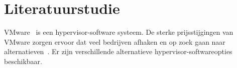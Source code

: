 






\section{Literatuurstudie}
\label{sec:literatuurstudie}
VMware~\autocite{vmware} is een hypervisor-software systeem. De sterke prijsstijgingen van VMware zorgen ervoor dat veel bedrijven afhaken en op zoek gaan naar alternatieven~\autocite{Hale2024}. Er zijn verschillende alternatieve \newline hypervisor-softwareopties beschikbaar.
